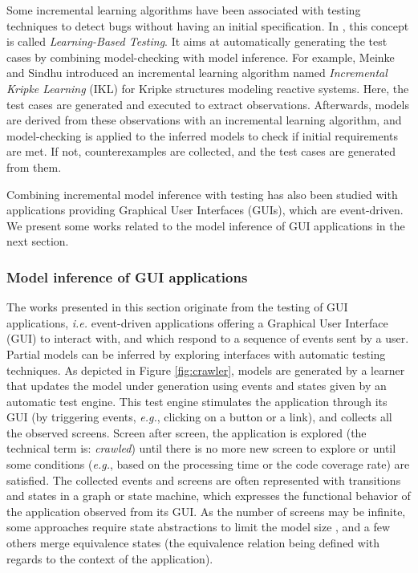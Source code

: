 Some incremental learning algorithms have been associated with
testing techniques to detect bugs without having an initial
specification. In \cite{Meinke:2004:ABT:1007512.1007532,tap2011},
this concept is called \textit{Learning-Based Testing}. It aims
at automatically generating the test cases by combining
model-checking with model inference. For example, Meinke and
Sindhu \cite{tap2011} introduced an incremental learning
algorithm named \textit{Incremental Kripke Learning} (IKL) for
Kripke structures modeling reactive systems. Here, the test
cases are generated and executed to extract observations.
Afterwards, models are derived from these observations with an
incremental learning algorithm, and model-checking is applied to
the inferred models to check if initial requirements are met. If
not, counterexamples are collected, and the test cases are
generated from them.

Combining incremental model inference with testing has also been
studied with applications providing Graphical User Interfaces
(GUIs), which are event-driven. We present some works related to
the model inference of GUI applications in the next section.

\subsubsection{Model inference of GUI applications}
\label{sec:active-crawling}

The works presented in this section originate from the testing of
GUI applications, \emph{i.e.} event-driven applications offering a
Graphical User Interface (GUI) to interact with, and which
respond to a sequence of events sent by a user. Partial models
can be inferred by exploring interfaces with automatic testing
techniques. As depicted in Figure \ref{fig:crawler}, models are
generated by a learner that updates the model under generation
using events and states given by an automatic test engine. This
test engine stimulates the application through its GUI (by
triggering events, \emph{e.g.}, clicking on a button or a link), and
collects all the observed screens.  Screen after screen, the
application is explored (the technical term is: \emph{crawled}) until
there is no more new screen to explore or until some conditions
(\emph{e.g.}, based on the processing time or the code coverage rate)
are satisfied. The collected events and screens are often
represented with transitions and states in a graph or state
machine, which expresses the functional behavior of the
application observed from its GUI. As the number of screens may
be infinite, some approaches require state abstractions to limit
the model size
\cite{MobiGUITARIEEESoftware2014,guitar,5954416,WPX13,SP15}, and
a few others merge equivalence states
\cite{crawljax:tweb12,4656395} (the equivalence relation being
defined with regards to the context of the application).

